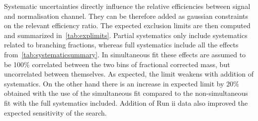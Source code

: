 Systematic uncertainties directly influence the relative efficiencies between signal and normalisation channel. They can be therefore added as gaussian constraints on the relevant efficiency ratio. The expected exclusion limits are then computed and summarized in~\autoref{tab:explimits}. Partial systematics only include systematics related to branching fractions, whereas full systematics include all the effects from~\autoref{tab:systematicsummary}. In simultaneous fit these effects are assumed to be 100\% correlated between the two bins of fractional corrected mass, but uncorrelated between themselves. As expected, the limit weakens with addition of systematics. On the other hand there is an increase in expected limit by $20\%$ obtained with the use of the simultaneous fit compared to the non-simultaneous fit with the full systematics included. Addition of Run \Rn{2} data also improved the expected sensitivity of the search. 

